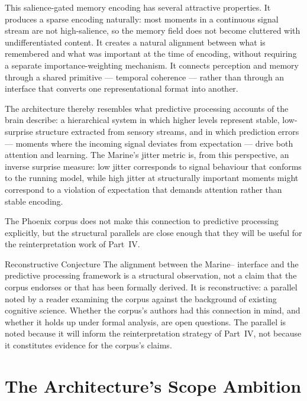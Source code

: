 This salience-gated memory encoding has several attractive
properties. It produces a sparse encoding naturally: most moments
in a continuous signal stream are not high-salience, so the memory
field does not become cluttered with undifferentiated content.
It creates a natural alignment between what is remembered and what
was important at the time of encoding, without requiring a separate
importance-weighting mechanism. It connects perception and memory
through a shared primitive --- temporal coherence --- rather than
through an interface that converts one representational format into
another.

The architecture thereby resembles what predictive processing
accounts of the brain describe: a hierarchical system in which
higher levels represent stable, low-surprise structure extracted
from sensory streams, and in which prediction errors --- moments
where the incoming signal deviates from expectation --- drive
both attention and learning. The Marine's jitter metric is, from
this perspective, an inverse surprise measure: low jitter corresponds
to signal behaviour that conforms to the running model, while high
jitter at structurally important moments might correspond to a
violation of expectation that demands attention rather than stable
encoding.

The Phoenix corpus does not make this connection to predictive
processing explicitly, but the structural parallels are close
enough that they will be useful for the reinterpretation work
of Part~IV.

\begin{epistemicstatus}{Reconstructive Conjecture}
The alignment between the Marine--\MEMeight{} interface and the
predictive processing framework is a structural observation, not
a claim that the corpus endorses or that has been formally derived.
It is reconstructive: a parallel noted by a reader examining the
corpus against the background of existing cognitive science. Whether
the corpus's authors had this connection in mind, and whether it
holds up under formal analysis, are open questions. The parallel
is noted because it will inform the reinterpretation strategy
of Part~IV, not because it constitutes evidence for the corpus's
claims.
\end{epistemicstatus}

\section{The Architecture's Scope Ambition}
\label{sec:mem8-scope}

